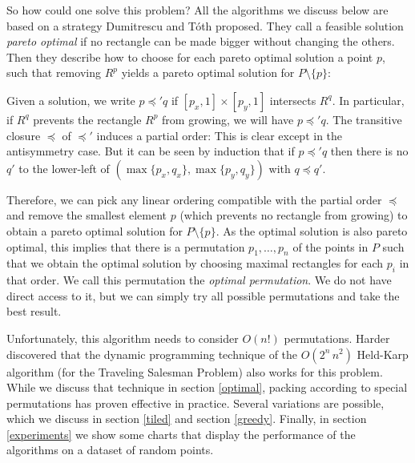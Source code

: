 \documentclass[11pt, a4paper, twocolumn]{article}
\begin{document}
So how could one solve this problem? All the algorithms we discuss below
are based on a strategy Dumitrescu and Tóth \cite{dumitrescu2015packing} proposed.
They call a feasible solution \textit{pareto optimal} if no rectangle can be
made bigger without changing the others.
Then they describe how to choose for each pareto optimal solution a point $p$,
such that removing $R^p$ yields a pareto optimal solution for $P\setminus\{p\}$:

Given a solution, we write $p \preceq' q$ if $[p_x, 1] \times [p_y, 1]$ intersects $R^q$.
In particular, if $R^q$ prevents the rectangle $R^p$ from growing, we will have $p \preceq' q$.
The transitive closure $\preceq$ of $\preceq'$ induces a partial order: This is clear except
in the antisymmetry case. But it can be seen by induction that if $p \preceq' q$ then
there is no $q'$ to the lower-left of $(\max \{p_x, q_x\}, \max \{p_y, q_y\})$ with $q \preceq q'$.


Therefore, we can pick any linear ordering compatible with the partial order $\preceq$ and
remove the smallest element $p$ (which prevents no rectangle from growing)
to obtain a pareto optimal solution for $P\setminus\{p\}$.
As the optimal solution is also pareto optimal, this implies that there is a
permutation $p_1, \dots, p_n$ of the points in $P$ such that we obtain the
optimal solution by choosing maximal rectangles for each $p_i$ in that order.
We call this permutation the \textit{optimal permutation}.
We do not have direct access to it, but we can simply try all possible
permutations and take the best result.

Unfortunately, this algorithm needs to consider $O(n!)$ permutations.
Harder \cite{harder2019anchoredrectanglecover} discovered that
the dynamic programming technique of the $O(2^n\,n^2)$ Held-Karp algorithm (for the
Traveling Salesman Problem)
also works for this problem. While we discuss that technique in section \ref{optimal},
packing according to special permutations has proven effective in practice.
Several variations are possible, which we discuss in section \ref{tiled} and section \ref{greedy}.
Finally, in section \ref{experiments} we show some charts that display the performance of the algorithms
on a dataset of random points.
\end{document}
